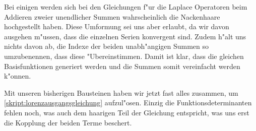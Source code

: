 Bei einigen werden sich bei den Gleichungen f"ur die Laplace Operatoren beim 
Addieren zweier unendlicher Summen wahrscheinlich die Nackenhaare hochgestellt 
haben. Diese Umformung sei uns aber erlaubt, da wir davon ausgehen m"ussen, 
dass die einzelnen Serien konvergent sind. Zudem h"alt uns nichts davon ab, die 
Indexe der beiden unabh"angigen Summen so umzubenennen, dass diese 
"Ubereinstimmen. Damit ist klar, dass die gleichen Basisfunktionen generiert 
werden und die Summen somit vereinfacht werden k"onnen.

Mit unseren bisherigen Bausteinen haben wir jetzt fast alles zusammen, um 
\cref{skript:lorenzausgangsgleichung} aufzul"osen. Einzig die 
Funktionsdeterminanten fehlen noch, was auch dem haarigen Teil der Gleichung 
entspricht, was uns erst die Kopplung der beiden Terme beschert.

